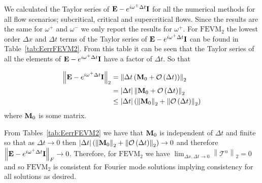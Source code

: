 We calculated the Taylor series of $\mathbf{E} -  e^{i \omega^\pm \Delta t}\mathbf{I}$ for all the numerical methods for all flow scenarios; subcritical, critical and supercritical flows. Since the results are the same for $\omega^+$ and $\omega^-$ we only report the results for $\omega^+$. For $\text{FEVM}_2$ the lowest order $\Delta x$ and $\Delta t$ terms of the Taylor series of $\mathbf{E} -  e^{i \omega^+ \Delta t}\mathbf{I}$ can be found in Table~\ref{tab:EerrFEVM2}. From this table it can be seen that the Taylor series of all the elements of $\mathbf{E} -  e^{i \omega^+ \Delta t}\mathbf{I}$ have a factor of $\Delta t$. So that

\begin{align*}
\left \| \mathbf{E} -  e^{i \omega^+ \Delta t}\mathbf{I} \right \|_2 &=  \left \| \Delta t \left(\mathbf{M}_0 +  \mathcal{O}\left(\Delta t\right)\right)\right \|_2  \nonumber\\ &= |\Delta t|  \left \| \mathbf{M}_0 +  \mathcal{O}\left(\Delta t\right)\right \|_2
 \nonumber\\ &\le  |\Delta t| \left(\left \| \mathbf{M}_0 \right \|_2 + \left \| \mathcal{O}\left(\Delta t\right)\right \|_2\right)
\end{align*} 
where $\mathbf{M}_0$ is some matrix.

From Tables~\ref{tab:EerrFEVM2} we have that $\mathbf{M}_0$ is independent of $\Delta t$ and finite so that as $\Delta t \rightarrow 0$ then $|\Delta t| \left(\left \| \mathbf{M}_0 \right \|_2 + \left \| \mathcal{O}\left(\Delta t\right)\right \|_2\right)  \rightarrow 0$  and therefore  $\left \| \mathbf{E} -  e^{i \omega^+ \Delta t}\mathbf{I} \right \|_F \rightarrow 0$. Therefore, for $\text{FEVM}_2$ we have $ \lim_{\Delta x,\Delta t \rightarrow 0}\left \| \mathcal{T}^n \right \|_2 = 0 $ and so  $\text{FEVM}_2$ is consistent for Fourier mode solutions implying consistency for all solutions as desired. 

